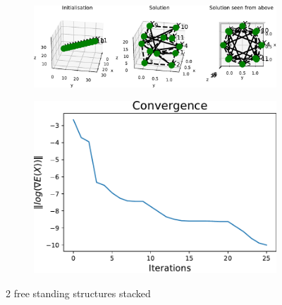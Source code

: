 \begin{figure}[!ht]
\centering
\begin{subfigure}{.72\textwidth}
  \centering
  \includegraphics[width=0.99\linewidth]{Bilder/2FREESTANDING.pdf}
\end{subfigure}%
\begin{subfigure}{.3\textwidth}
  \centering
  \includegraphics[width=0.99\linewidth]{Bilder/2FREESTANDINGconv.pdf}
  \label{fig:sub2}
\end{subfigure}
\caption{2 free standing structures stacked}
\label{P69}
\end{figure}